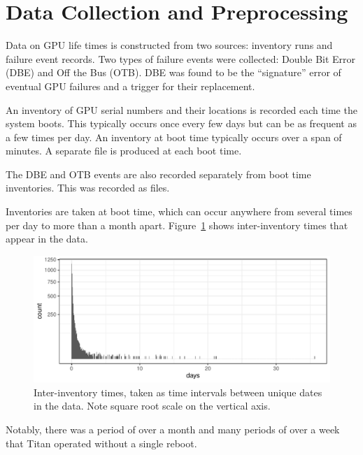 \section{Data Collection and Preprocessing}
\label{section:dataprep}
Data on GPU life times is constructed from two sources: inventory runs
and failure event records. Two types of failure events were collected:
Double Bit Error (DBE) and Off the Bus (OTB). DBE was found to be the
``signature'' error of eventual GPU failures and a trigger for their
replacement. 

An inventory of GPU serial numbers and their locations is recorded
each time the system boots.  This typically occurs once every few days but
can be as frequent as a few times per day. An inventory at boot time
typically occurs over a span of  minutes. A separate file is
produced at each boot time.

The DBE and OTB events are also recorded separately from boot
time inventories. This was recorded as  files.

Inventories are taken at boot time, which can occur anywhere from
several times per day to more than a month
apart. Figure~\ref{fig:inventory} shows inter-inventory times that
appear in the data.
\begin{figure}[bt]
  \begin{center}
    \includegraphics[width=\columnwidth]{figs/attention_intervals001.pdf}
  \end{center}
  \caption{Inter-inventory times, taken as time intervals between
    unique dates in the data. Note square root scale on the vertical
    axis.}
  \label{fig:inventory}
\end{figure}
Notably, there was a period of over a month and many periods of over a
week that Titan operated without a single reboot.

